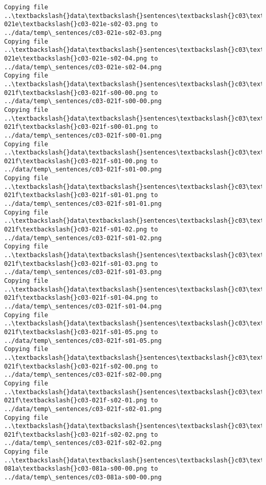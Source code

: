 \documentclass[11pt]{article}
\begin{document}
\begin{Verbatim}[commandchars=\\\{\}]
Copying file ..\textbackslash{}data\textbackslash{}sentences\textbackslash{}c03\textbackslash{}c03-021e\textbackslash{}c03-021e-s02-03.png to
../data/temp\_sentences/c03-021e-s02-03.png
Copying file ..\textbackslash{}data\textbackslash{}sentences\textbackslash{}c03\textbackslash{}c03-021e\textbackslash{}c03-021e-s02-04.png to
../data/temp\_sentences/c03-021e-s02-04.png
Copying file ..\textbackslash{}data\textbackslash{}sentences\textbackslash{}c03\textbackslash{}c03-021f\textbackslash{}c03-021f-s00-00.png to
../data/temp\_sentences/c03-021f-s00-00.png
Copying file ..\textbackslash{}data\textbackslash{}sentences\textbackslash{}c03\textbackslash{}c03-021f\textbackslash{}c03-021f-s00-01.png to
../data/temp\_sentences/c03-021f-s00-01.png
Copying file ..\textbackslash{}data\textbackslash{}sentences\textbackslash{}c03\textbackslash{}c03-021f\textbackslash{}c03-021f-s01-00.png to
../data/temp\_sentences/c03-021f-s01-00.png
Copying file ..\textbackslash{}data\textbackslash{}sentences\textbackslash{}c03\textbackslash{}c03-021f\textbackslash{}c03-021f-s01-01.png to
../data/temp\_sentences/c03-021f-s01-01.png
Copying file ..\textbackslash{}data\textbackslash{}sentences\textbackslash{}c03\textbackslash{}c03-021f\textbackslash{}c03-021f-s01-02.png to
../data/temp\_sentences/c03-021f-s01-02.png
Copying file ..\textbackslash{}data\textbackslash{}sentences\textbackslash{}c03\textbackslash{}c03-021f\textbackslash{}c03-021f-s01-03.png to
../data/temp\_sentences/c03-021f-s01-03.png
Copying file ..\textbackslash{}data\textbackslash{}sentences\textbackslash{}c03\textbackslash{}c03-021f\textbackslash{}c03-021f-s01-04.png to
../data/temp\_sentences/c03-021f-s01-04.png
Copying file ..\textbackslash{}data\textbackslash{}sentences\textbackslash{}c03\textbackslash{}c03-021f\textbackslash{}c03-021f-s01-05.png to
../data/temp\_sentences/c03-021f-s01-05.png
Copying file ..\textbackslash{}data\textbackslash{}sentences\textbackslash{}c03\textbackslash{}c03-021f\textbackslash{}c03-021f-s02-00.png to
../data/temp\_sentences/c03-021f-s02-00.png
Copying file ..\textbackslash{}data\textbackslash{}sentences\textbackslash{}c03\textbackslash{}c03-021f\textbackslash{}c03-021f-s02-01.png to
../data/temp\_sentences/c03-021f-s02-01.png
Copying file ..\textbackslash{}data\textbackslash{}sentences\textbackslash{}c03\textbackslash{}c03-021f\textbackslash{}c03-021f-s02-02.png to
../data/temp\_sentences/c03-021f-s02-02.png
Copying file ..\textbackslash{}data\textbackslash{}sentences\textbackslash{}c03\textbackslash{}c03-081a\textbackslash{}c03-081a-s00-00.png to
../data/temp\_sentences/c03-081a-s00-00.png

\end{Verbatim}
\end{document}
